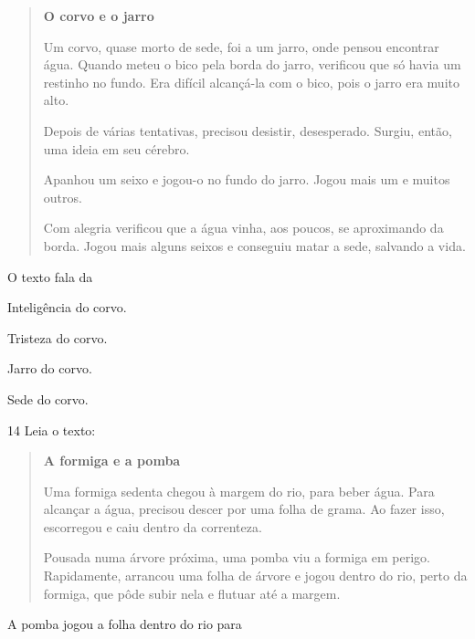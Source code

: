 \begin{quote}
\textbf{O corvo e o jarro}

Um corvo, quase morto de sede, foi a um jarro, onde pensou encontrar
água. Quando meteu o bico pela borda do jarro, verificou que só havia um
restinho no fundo. Era difícil alcançá-la com o bico, pois o jarro era
muito alto.

Depois de várias tentativas, precisou desistir, desesperado. Surgiu,
então, uma ideia em seu cérebro.

Apanhou um seixo e jogou-o no fundo do jarro. Jogou mais
um e muitos outros.

Com alegria verificou que a água vinha, aos poucos, se aproximando da
borda. Jogou mais alguns seixos e conseguiu matar a sede, salvando a
vida.

\end{quote}

O texto fala da

\begin{multicols}{2}
\begin{escolha}
\item Inteligência do corvo.

\item Tristeza do corvo.

\item Jarro do corvo.

\item Sede do corvo.
\end{escolha}
\end{multicols}
\num{14} Leia o texto:

\begin{quote}
\textbf{A formiga e a pomba}

Uma formiga sedenta chegou à margem do rio, para beber água. Para alcançar a água, precisou descer por uma folha de grama. Ao fazer isso, escorregou e caiu dentro da correnteza.

Pousada numa árvore próxima, uma pomba viu a formiga em perigo. Rapidamente, arrancou uma folha de árvore e jogou dentro do rio, perto da formiga, que pôde subir nela e flutuar até a margem.

\end{quote}

A pomba jogou a folha dentro do rio para


